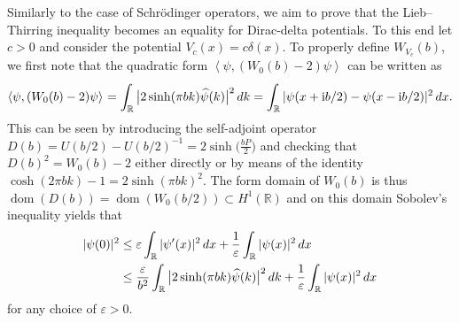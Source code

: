 \documentclass[11pt]{article}
\numberwithin{equation}{section}
\numberwithin{equation}{section}
\newcommand{\eps}{\varepsilon}
\newcommand{\ii}{\mathrm{i}}
\newcommand{\R}{\mathbb{R}}
\newcommand{\sclp}[2][]{{\left\langle#2\right\rangle} _{#1}}
\DeclareMathOperator{\dom}{dom}
\begin{document}
Similarly to the case of Schr\"odinger operators, we aim to prove that the Lieb--Thirring inequality becomes an equality for Dirac-delta potentials. To this end let $c>0$ and consider the potential $V_c(x)=c\delta(x)$. To properly define $W_{V_c}(b)$, we first note that the quadratic form $\sclp{\psi,(W_0(b)-2)\psi}$ can be written as
\begin{gather}
\sclp{\psi,(W_0(b)-2)\psi}=\int_{\R}\big|2\sinh(\pi b k)\widehat{\psi}(k)\big|^2 \, {\rm d} k=\int_{\R}|\psi(x+\ii b/2)-\psi(x-\ii b/2)|^2\, {\rm d} x.
\label{quadratic}
\end{gather}
This can be seen by introducing the self-adjoint operator $D(b)=U(b/2)-U(b/2)^{-1}= 2\sinh\big(\frac{bP}2\big)$ and checking that $D(b)^2=W_0(b)-2$ either directly or by means of the identity $\cosh(2\pi b k)-1\allowbreak=2\sinh(\pi b k)^2$. The form domain of $W_0(b)$ is thus $\dom(D(b))=\dom(W_0(b/2))\subset H^1(\R)$ and on this domain Sobolev's inequality yields that
\begin{align*}
|\psi(0)|^2&\le \eps\int_{\R}|\psi'(x)|^2 \, {\rm d} x+\frac1\eps\int_{\R}|\psi(x)|^2\, {\rm d} x\\
&\le\frac{\eps}{b^2}\int_{\R}\big|2\sinh(\pi b k)\widehat{\psi}(k)\big|^2\, {\rm d} k+\frac1\eps\int_{\R}|\psi(x)|^2\, {\rm d} x
\end{align*}
for any choice of $\eps>0$.
\end{document}
